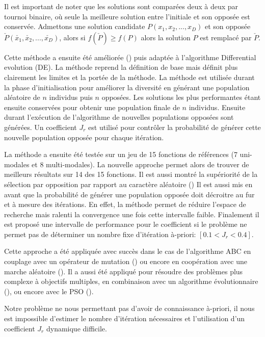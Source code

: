 Il est important de noter que les solutions sont comparées deux à deux par tournoi binaire, où
seule la meilleure solution entre l’initiale et son opposée est conservée. Admettons une solution
candidate $P(x_{1}, x_{2}, ..., x_{D})$ et son opposée $\check{P}(\check{x_{1}}, \check{x_{2}}, ..., \check{x_{D}})$,
alors si $f(\check{P}) \geq f(P)$ alors la solution $P$ est remplacé par $\check{P}$.

Cette méthode a ensuite été améliorée (\cite{Rahnamayan2008155}) puis adaptée à
l’algorithme Differential evolution (DE). La méthode reprend la définition de base
mais définit plus clairement les limites et la portée de la méthode.
La méthode est utilisée durant la phase d’initialisation pour améliorer la diversité
en générant une population aléatoire de $n$ individus puis $n$ opposées.
Les solutions les plus performantes étant ensuite conservées pour obtenir une population
finale de $n$ individus.
Ensuite durant l’exécution de l’algorithme de nouvelles populations opposées sont générées.
Un coefficient $J_r$ est utilisé pour contrôler la probabilité de générer cette nouvelle
population opposée pour chaque itération.

La méthode a ensuite été testée sur un jeu de 15 fonctions de références (7 uni-modales
et 8 multi-modales). La nouvelle approche permet alors de trouver de meilleurs
résultats sur 14 des 15 fonctions. Il est aussi montré la supériorité de la
sélection par opposition par rapport au caractère aléatoire (\cite{Rahnamayan2008155,Rahnamayan2008906})
Il est aussi mis en avant que la probabilité de générer une population opposée
doit décroitre au fur et à mesure des itérations. En effet, la méthode permet de
réduire l’espace de recherche mais ralenti la convergence une fois cette intervalle
faible. Finalement il est proposé une intervalle de performance pour le coefficient si le problème
ne permet pas de déterminer un nombre fixe d’itération à-priori: $[0.1 < J_r < 0.4]$.

Cette approche a été appliquée avec succès dans le cas de l’algorithme ABC en couplage
avec un opérateur de mutation (\cite{Bi2011174}) ou encore en coopération avec une marche
aléatoire (\cite{Sharma2012213}).
Il a aussi été appliqué pour résoudre des problèmes plus complexe à objectifs multiples,
en combinaison avec un algorithme évolutionnaire (\cite{Ma201448}), ou encore avec le PSO (\cite{Gao2013114}).

Notre problème ne nous permettant pas d’avoir de connaissance à-priori, il nous est
impossible d’estimer le nombre d’itération nécessaires et l’utilisation d’un coefficient $J_r$
dynamique difficile.

